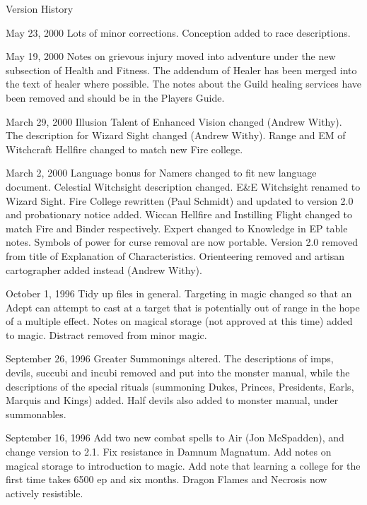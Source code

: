 \begin{Chapter}{Version History}
\begin{Description}
\item[May 23, 2000] Lots of minor corrections.  Conception added to
  race descriptions.

\item[May 19, 2000] Notes on grievous injury moved into adventure
  under the new subsection of Health and Fitness. The addendum of
  Healer has been merged into the text of healer where possible.  The
  notes about the Guild healing services have been removed and
  should be in the Players Guide.

\item[March 29, 2000] Illusion Talent of Enhanced Vision changed
  (Andrew Withy).  The description for Wizard Sight changed (Andrew
  Withy). Range and EM of Witchcraft Hellfire changed to match new
  Fire college.

\item[March 2, 2000] Language bonus for Namers changed to fit new
  language document.  Celestial Witchsight description changed.  E\&E
  Witchsight renamed to Wizard Sight.  Fire College rewritten (Paul
  Schmidt) and updated to version 2.0 and probationary notice added.
  Wiccan Hellfire and Instilling Flight changed to match Fire and
  Binder respectively.  Expert changed to Knowledge in EP table notes.
  Symbols of power for curse removal are now portable.  Version 2.0
  removed from title of Explanation of Characteristics.  Orienteering
  removed and artisan cartographer added instead (Andrew Withy).

\item[October 1, 1996] Tidy up files in general. Targeting in magic
  changed so that an Adept can attempt to cast at a target that is
  potentially out of range in the hope of a multiple effect. Notes on
  magical storage (not approved at this time) added to magic. Distract
  removed from minor magic.

\item[September 26, 1996] Greater Summonings altered.  The
  descriptions of imps, devils, succubi and incubi removed and put
  into the monster manual, while the descriptions of the special
  rituals (summoning Dukes, Princes, Presidents, Earls, Marquis and
  Kings) added.  Half devils also added to monster manual, under
  summonables.

\item[September 16, 1996] Add two new combat spells to Air (Jon
  McSpadden), and change version to 2.1.  Fix resistance in Damnum
  Magnatum.  Add notes on magical storage to introduction to magic.
  Add note that learning a college for the first time takes 6500 ep
  and six months.  Dragon Flames and Necrosis now actively resistible.


\end{Description}
\end{Chapter}
